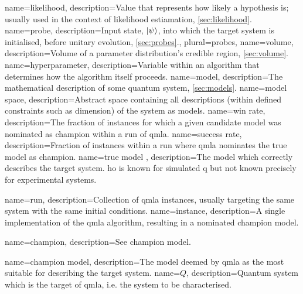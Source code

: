 {
    name=likelihood,
    description={Value that represents how likely a hypothesis is; usually used in the context of likelihood estiamation, \cref{sec:likelihood}.}
}
{
    name=probe,
    description={Input state, $\ket{\psi}$, into which the target system is initialised, before unitary evolution, \cref{sec:probes}.},
    plural={probes},
}
{
    name=volume,
    description={Volume of a parameter distribution's credible region, \cref{sec:volume}.}
}
{
    name=hyperparameter,
    description={Variable within an algorithm that determines how the algorithm itself proceeds.}
}
{
    name=model,
    description={The mathematical description of some quantum system, \cref{sec:models}.}
}
{
    name=model space,
    description={Abstract space containing all descriptions (within defined constraints such as dimension) of the system as \glspl{model}.}
}
{
    name=win rate,
    description={The fraction of \glspl{instance} for which a given candidate \gls{model} was nominated as \gls{champion}
        within a \gls{run} of \acrshort{qmla}.
    }
}
{
    name=success rate,
    description={Fraction of \glspl{instance} within a \gls{run} where \acrshort{qmla} nominates the \gls{true model} as \gls{champion}.}
}
{
    name={true model} ,
    description={The model which correctly describes the target system. 
        \gls{ho} is known for simulated \gls{q} but not known precisely for experimental systems.
    }
}

{
    name=run,
    description={Collection of \acrshort{qmla} \glspl{instance}, usually targeting the same system with the same initial conditions.}
}
{
    name=instance,
    description={A single implementation of the \acrshort{qmla} algorithm, resulting in a nominated \gls{champion model}.}
}

{
    name=champion,
    description={See \gls{champion model}.}
}

{
    name=champion model,
    description={The model deemed by \acrshort{qmla} as the most suitable for describing the target system.}
}
{
    name=$Q$,
    description={Quantum system which is the target of \acrshort{qmla}, i.e. the system to be characterised.}
}

